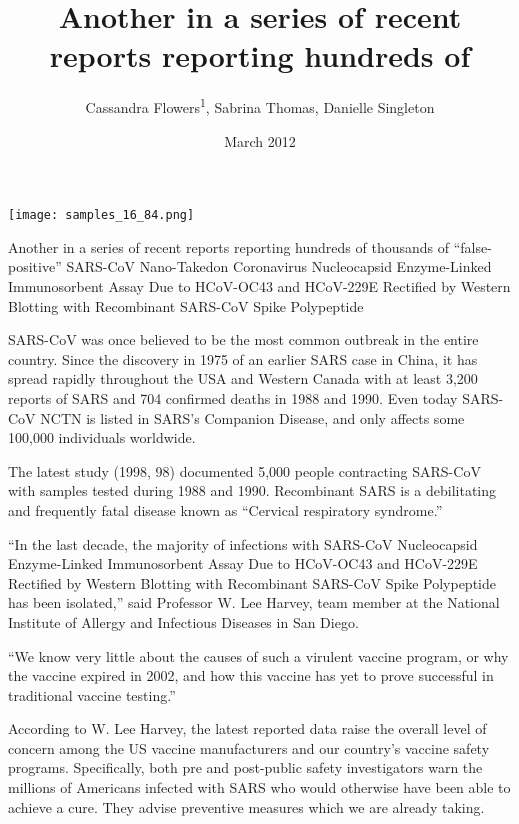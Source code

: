 \documentclass{article}
\title{Another in a series of recent reports reporting hundreds of}
\author{Cassandra Flowers\textsuperscript{1},  Sabrina Thomas,  Danielle Singleton}
\affil{\textsuperscript{1}American University of Beirut}
\date{March 2012}
\begin{document}
\maketitle

\begin{center}
\begin{minipage}{0.75\linewidth}
\texttt{[image: samples\_16\_84.png]}
\end{minipage}
\end{center}

Another in a series of recent reports reporting hundreds of thousands of “false-positive” SARS-CoV Nano-Takedon Coronavirus Nucleocapsid Enzyme-Linked Immunosorbent Assay Due to HCoV-OC43 and HCoV-229E Rectified by Western Blotting with Recombinant SARS-CoV Spike Polypeptide

SARS-CoV was once believed to be the most common outbreak in the entire country. Since the discovery in 1975 of an earlier SARS case in China, it has spread rapidly throughout the USA and Western Canada with at least 3,200 reports of SARS and 704 confirmed deaths in 1988 and 1990. Even today SARS-CoV NCTN is listed in SARS’s Companion Disease, and only affects some 100,000 individuals worldwide.

The latest study (1998, 98) documented 5,000 people contracting SARS-CoV with samples tested during 1988 and 1990. Recombinant SARS is a debilitating and frequently fatal disease known as “Cervical respiratory syndrome.”

“In the last decade, the majority of infections with SARS-CoV Nucleocapsid Enzyme-Linked Immunosorbent Assay Due to HCoV-OC43 and HCoV-229E Rectified by Western Blotting with Recombinant SARS-CoV Spike Polypeptide has been isolated,” said Professor W. Lee Harvey, team member at the National Institute of Allergy and Infectious Diseases in San Diego.

“We know very little about the causes of such a virulent vaccine program, or why the vaccine expired in 2002, and how this vaccine has yet to prove successful in traditional vaccine testing.”

According to W. Lee Harvey, the latest reported data raise the overall level of concern among the US vaccine manufacturers and our country’s vaccine safety programs. Specifically, both pre and post-public safety investigators warn the millions of Americans infected with SARS who would otherwise have been able to achieve a cure. They advise preventive measures which we are already taking.
\end{document}
